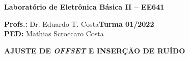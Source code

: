 \documentclass[addpoints]{exam}
\begin{document}
 
\large

\begin{center}
\Large
\textbf{Laboratório de Eletrônica Básica II – EE641}
\end{center}

\large
\vspace{2mm}

\noindent\textbf{Profs.:} Dr. Eduardo T. Costa\hfill \textbf{Turma 01/2022} \\
\textbf{PED:} Mathias Scroccaro Costa \hfill %

\normalsize
 
\vspace{5mm}
 

 
\noindent{}
\hfill
{}

\vspace{5mm}

\noindent{}
\hfill
{}

\vspace{5mm}

\noindent{}
\hfill
{}




\vspace{2mm}


\begin{center}
\large
\textbf{AJUSTE DE \textit{OFFSET} E INSERÇÃO DE RUÍDO}
\normalsize
\end{center}
\end{document}
